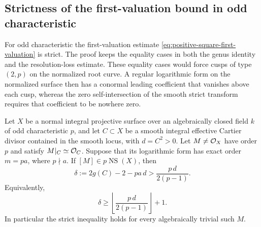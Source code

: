 \subsection{Strictness of the first-valuation bound in odd characteristic}
\label{subsec:odd-positive-excess-strict}

For odd characteristic the first-valuation estimate
\eqref{eq:positive-square-first-valuation} is strict.
The proof keeps the equality cases in both the genus identity and the
resolution-loss estimate. These equality cases would force cusps of
type $(2,p)$ on the normalized root curve. A regular logarithmic form
on the normalized surface then has a conormal leading coefficient
that vanishes above each cusp, whereas the zero self-intersection
of the smooth strict transform requires that coefficient to be
nowhere zero.

\begin{theorem}\label{thm:odd-positive-excess-strict}
Let $X$ be a normal integral projective surface over an algebraically
closed field $k$ of odd characteristic $p$, and let $C\subset X$ be
a smooth integral effective Cartier divisor contained in the smooth
locus, with $d=C^2>0$.
Let $M\ne\mathcal O_X$ have order $p$ and satisfy
$M|_C\simeq\mathcal O_C$.
Suppose that its logarithmic form has exact order
$m=pa$, where $p\nmid a$.
If $[M]\in p\operatorname{NS}(X)$, then
\[
 \delta:=2g(C)-2-pa\,d>\frac{p\,d}{2(p-1)}.
\]
Equivalently,
\[
 \delta\geq
 \left\lfloor\frac{p\,d}{2(p-1)}\right\rfloor+1.
\]
In particular the strict inequality holds for every algebraically
trivial such $M$.
\end{theorem}

